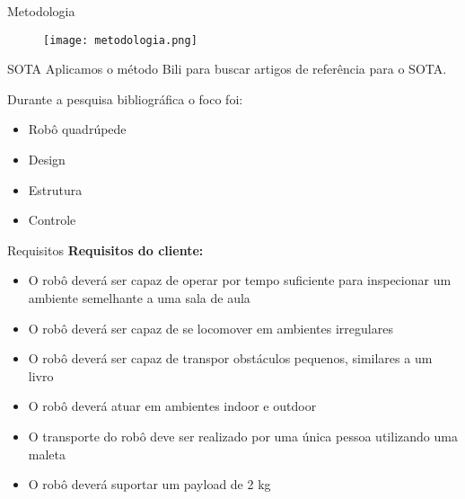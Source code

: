 \begin{frame}[t]{Metodologia}
    \begin{figure}
        \texttt{[image: metodologia.png]}
    \end{figure}
\end{frame}

\begin{frame}[t]{SOTA}
    Aplicamos o método Bili para buscar artigos de referência para o SOTA.

    Durante a pesquisa bibliográfica o foco foi:
    \begin{itemize}
        \item Robô quadrúpede
        \item Design
        \item Estrutura
        \item Controle
    \end{itemize}


\end{frame}

\begin{frame}[t]{Requisitos}
    \textbf{Requisitos do cliente:}
    \begin{itemize}
        \item O robô deverá ser capaz de operar por tempo suficiente para inspecionar um ambiente semelhante a uma sala de aula
        \item O robô deverá ser capaz de se locomover em ambientes irregulares
        \item O robô deverá ser capaz de transpor obstáculos pequenos, similares a um livro
        \item O robô deverá atuar em ambientes indoor e outdoor
        \item O transporte do robô deve ser realizado por uma única pessoa utilizando uma maleta
        \item O robô deverá suportar um payload de 2 kg
    \end{itemize}

\end{frame}

